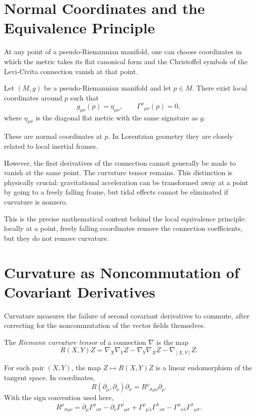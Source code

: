 \clearpage

\section{Normal Coordinates and the Equivalence Principle}

At any point of a pseudo-Riemannian manifold, one can choose coordinates in
which the metric takes its flat canonical form and the Christoffel symbols of
the Levi-Civita connection vanish at that point.

\begin{theorembox}
Let \((M,g)\) be a pseudo-Riemannian manifold and let \(p\in M\). There exist
local coordinates around \(p\) such that
\[
g_{\mu\nu}(p)=\eta_{\mu\nu},
\qquad
\Gamma^\rho{}_{\mu\nu}(p)=0,
\]
where \(\eta_{\mu\nu}\) is the diagonal flat metric with the same signature as
\(g\).
\end{theorembox}

These are normal coordinates at \(p\). In Lorentzian geometry they are closely
related to local inertial frames.

However, the first derivatives of the connection cannot generally be made to
vanish at the same point. The curvature tensor remains. This distinction is
physically crucial: gravitational acceleration can be transformed away at a
point by going to a freely falling frame, but tidal effects cannot be eliminated
if curvature is nonzero.

This is the precise mathematical content behind the local equivalence principle:
locally at a point, freely falling coordinates remove the connection
coefficients, but they do not remove curvature.

\clearpage

\section{Curvature as Noncommutation of Covariant Derivatives}

Curvature measures the failure of second covariant derivatives to commute, after
correcting for the noncommutation of the vector fields themselves.

\begin{definitionbox}
The \emph{Riemann curvature tensor} of a connection \(\nabla\) is the map
\[
R(X,Y)Z=
\nabla_X\nabla_YZ-
\nabla_Y\nabla_XZ-
\nabla_{[X,Y]}Z.
\]
\end{definitionbox}

For each pair \((X,Y)\), the map \(Z\mapsto R(X,Y)Z\) is a linear endomorphism
of the tangent space. In coordinates,
\[
R(\partial_\mu,\partial_\nu)\partial_\sigma
=R^\rho{}_{\sigma\mu\nu}\partial_\rho.
\]
With the sign convention used here,
\[
\boxed{
R^\rho{}_{\sigma\mu\nu}
=
\partial_\mu\Gamma^\rho{}_{\nu\sigma}
-
\partial_\nu\Gamma^\rho{}_{\mu\sigma}
+\Gamma^\rho{}_{\mu\lambda}\Gamma^\lambda{}_{\nu\sigma}
-\Gamma^\rho{}_{\nu\lambda}\Gamma^\lambda{}_{\mu\sigma}.
}
\]

